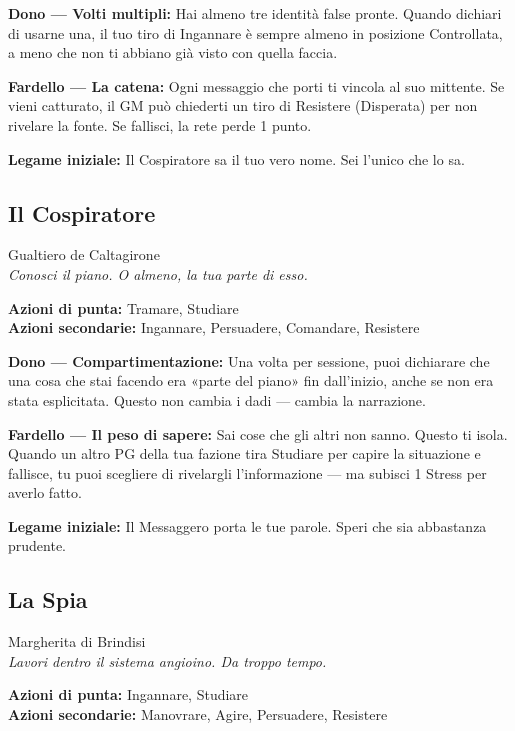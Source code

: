 \textbf{Dono — Volti multipli:} Hai almeno tre identità false pronte.
Quando dichiari di usarne una, il tuo tiro di Ingannare è sempre
almeno in posizione Controllata, a meno che non ti abbiano già visto
con quella faccia.

\textbf{Fardello — La catena:} Ogni messaggio che porti ti vincola
al suo mittente. Se vieni catturato, il GM può chiederti un tiro di
Resistere (Disperata) per non rivelare la fonte. Se fallisci, la rete
perde 1 punto.

\textbf{Legame iniziale:} Il Cospiratore sa il tuo vero nome. Sei
l'unico che lo sa.

\filetto

\subsection{Il Cospiratore}
{\cinzel\footnotesize\color{grigionote} Gualtiero de Caltagirone}\\
\textit{Conosci il piano. O almeno, la tua parte di esso.}

\textbf{Azioni di punta:} Tramare, Studiare\\
\textbf{Azioni secondarie:} Ingannare, Persuadere, Comandare, Resistere

\textbf{Dono — Compartimentazione:} Una volta per sessione, puoi
dichiarare che una cosa che stai facendo era «parte del piano»
fin dall'inizio, anche se non era stata esplicitata. Questo non
cambia i dadi — cambia la narrazione.

\textbf{Fardello — Il peso di sapere:} Sai cose che gli altri non sanno.
Questo ti isola. Quando un altro PG della tua fazione tira Studiare
per capire la situazione e fallisce, tu puoi scegliere di rivelargli
l'informazione — ma subisci 1 Stress per averlo fatto.

\textbf{Legame iniziale:} Il Messaggero porta le tue parole. Speri
che sia abbastanza prudente.

\filetto

\subsection{La Spia}
{\cinzel\footnotesize\color{grigionote} Margherita di Brindisi}\\
\textit{Lavori dentro il sistema angioino. Da troppo tempo.}

\textbf{Azioni di punta:} Ingannare, Studiare\\
\textbf{Azioni secondarie:} Manovrare, Agire, Persuadere, Resistere

